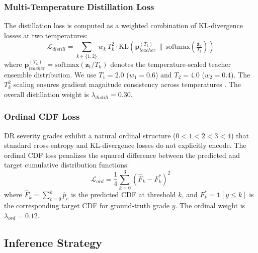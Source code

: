 \documentclass[a4paper,fleqn]{cas-dc}
\begin{document}
                            \subsubsection{Multi-Temperature Distillation Loss}
                            The distillation loss is computed as a weighted combination of KL-divergence losses at two temperatures:
                            \begin{equation}
                              \mathcal{L}_{distill} = \sum_{k \in \{1,2\}} w_k\, T_k^2 \cdot
                                \text{KL}\!\left(\mathbf{p}_{teacher}^{(T_k)} \,\Big\|\,
                                  \text{softmax}\!\left(\tfrac{\mathbf{z}_s}{T_k}\right)\right)
                                  \end{equation}
                                  where $\mathbf{p}_{teacher}^{(T_k)}=\mathrm{softmax}(\mathbf{z}_t/T_k)$ denotes the temperature-scaled teacher ensemble distribution. We use $T_1{=}2.0$ ($w_1{=}0.6$) and $T_2{=}4.0$ ($w_2{=}0.4$). The $T_k^2$ scaling ensures gradient magnitude consistency across temperatures \cite{hinton2015}. The overall distillation weight is $\lambda_{distill} = 0.30$.

                                  \subsubsection{Ordinal CDF Loss}
                                  DR severity grades exhibit a natural ordinal structure ($0 < 1 < 2 < 3 < 4$) that standard cross-entropy and KL-divergence losses do not explicitly encode. The ordinal CDF loss penalizes the squared difference between the predicted and target cumulative distribution functions:
                                  \begin{equation}
                                    \mathcal{L}_{ord} = \frac{1}{4}\sum_{k=0}^{3} \left(\hat{F}_k - F_k^*\right)^2
                                    \end{equation}
                                    where $\hat{F}_k = \sum_{c=0}^{k} \hat{p}_c$ is the predicted CDF at threshold $k$, and $F_k^* = \mathbf{1}[y \leq k]$ is the corresponding target CDF for ground-truth grade $y$. The ordinal weight is $\lambda_{ord} = 0.12$.

                                    \subsection{Inference Strategy}
\end{document}
